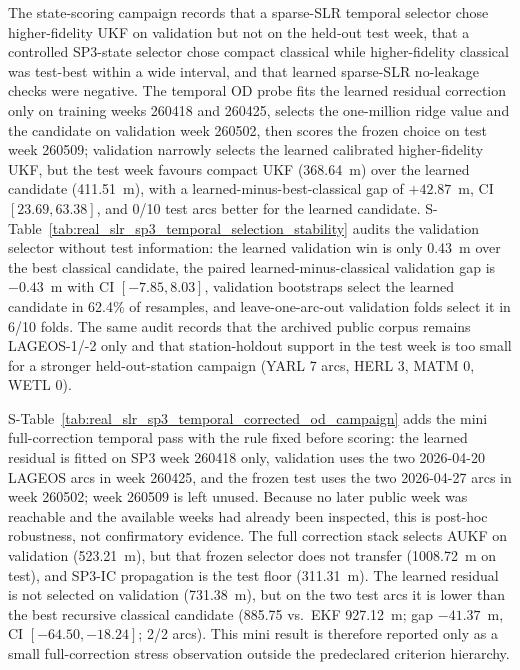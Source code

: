 \documentclass{article}
\begin{document}
The state-scoring campaign records that a sparse-SLR temporal selector chose higher-fidelity UKF on validation but not on the held-out test week, that a controlled SP3-state selector chose compact classical while higher-fidelity classical was test-best within a wide interval, and that learned sparse-SLR no-leakage checks were negative. The temporal OD probe fits the learned residual correction only on training weeks 260418 and 260425, selects the one-million ridge value and the candidate on validation week 260502, then scores the frozen choice on test week 260509; validation narrowly selects the learned calibrated higher-fidelity UKF, but the test week favours compact UKF (368.64~m) over the learned candidate (411.51~m), with a learned-minus-best-classical gap of \(+42.87\)~m, CI \([23.69,63.38]\), and 0/10 test arcs better for the learned candidate. S-Table~\ref{tab:real_slr_sp3_temporal_selection_stability} audits the validation selector without test information: the learned validation win is only 0.43~m over the best classical candidate, the paired learned-minus-classical validation gap is \(-0.43\)~m with CI \([-7.85,8.03]\), validation bootstraps select the learned candidate in 62.4\% of resamples, and leave-one-arc-out validation folds select it in 6/10 folds. The same audit records that the archived public corpus remains LAGEOS-1/-2 only and that station-holdout support in the test week is too small for a stronger held-out-station campaign (YARL 7 arcs, HERL 3, MATM 0, WETL 0).

S-Table~\ref{tab:real_slr_sp3_temporal_corrected_od_campaign} adds the mini full-correction temporal pass with the rule fixed before scoring: the learned residual is fitted on SP3 week 260418 only, validation uses the two 2026-04-20 LAGEOS arcs in week 260425, and the frozen test uses the two 2026-04-27 arcs in week 260502; week 260509 is left unused. Because no later public week was reachable and the available weeks had already been inspected, this is post-hoc robustness, not confirmatory evidence. The full correction stack selects AUKF on validation (523.21~m), but that frozen selector does not transfer (1008.72~m on test), and SP3-IC propagation is the test floor (311.31~m). The learned residual is not selected on validation (731.38~m), but on the two test arcs it is lower than the best recursive classical candidate (885.75 vs.\ EKF 927.12~m; gap \(-41.37\)~m, CI \([-64.50,-18.24]\); 2/2 arcs). This mini result is therefore reported only as a small full-correction stress observation outside the predeclared criterion hierarchy.
\end{document}
